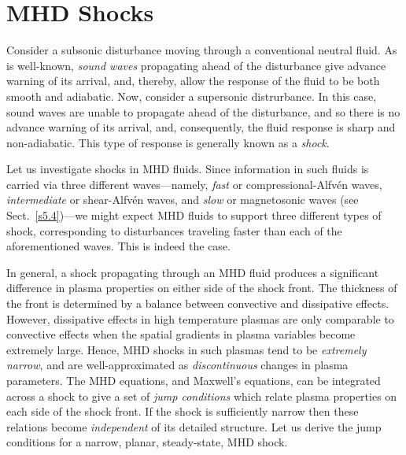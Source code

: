 \section{MHD Shocks}
Consider a subsonic disturbance moving through a conventional neutral fluid.
As is well-known, {\em sound waves}\/ propagating ahead of the disturbance
give advance warning of its arrival, and,
thereby, allow the  response of the fluid to be both smooth  and adiabatic. Now, consider a supersonic  distrurbance. In this case, sound waves are
unable to propagate ahead of the disturbance, and so there is no advance warning of its
arrival, and, consequently,  the fluid response is sharp and non-adiabatic. This type of response is generally known as a {\em shock}. 

 Let us investigate shocks in MHD fluids. Since information in such fluids is
carried via three different waves---namely,  {\em fast}\/
or compressional-Alfv\'{e}n waves, {\em intermediate}\/ or shear-Alfv\'{e}n waves, and  {\em slow}\/ or magnetosonic waves (see Sect.~\ref{s5.4})---we might expect MHD fluids to support
three different types of shock, corresponding to disturbances traveling
faster than each of the  aforementioned waves. This is indeed the case. 

In general, a shock propagating through an MHD fluid produces a significant  difference in plasma properties on either side of the shock front.
The thickness of the front is determined by a balance between convective
and dissipative effects. However, dissipative effects in high temperature
plasmas are only  comparable to convective effects when the spatial gradients
in plasma variables become extremely large. Hence, MHD shocks in such plasmas tend to be {\em extremely narrow}, and are well-approximated
as  {\em discontinuous}\/ changes in plasma parameters. The MHD equations,
and Maxwell's equations, can be integrated across a shock
to give a set of {\em jump conditions}\/ which   relate  plasma properties on
each side of the shock front. If the shock is sufficiently narrow then these relations become {\em independent}\/ of its detailed structure. Let us derive the
jump conditions for a narrow, planar, steady-state, MHD shock.

